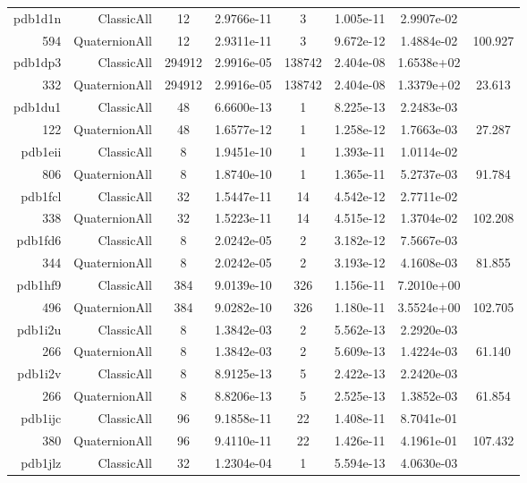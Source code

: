 \begin{xltabular}{\textwidth}{r|rcS[table-format=1.4e+2]cS[table-format=1.3e+2]S[table-format=1.4e+2]S[table-format=-1.3]}
pdb1d1n & ClassicAll & 12 & 2.9766e-11 & 3 & 1.005e-11 & 2.9907e-02 & \\
594 & QuaternionAll & 12 & 2.9311e-11 & 3 & 9.672e-12 & 1.4884e-02 & 100.927\\  \addlinespace
pdb1dp3 & ClassicAll & 294912 & 2.9916e-05 & 138742 & 2.404e-08 & 1.6538e+02 & \\
332 & QuaternionAll & 294912 & 2.9916e-05 & 138742 & 2.404e-08 & 1.3379e+02 & 23.613\\  \addlinespace
pdb1du1 & ClassicAll & 48 & 6.6600e-13 & 1 & 8.225e-13 & 2.2483e-03 & \\
122 & QuaternionAll & 48 & 1.6577e-12 & 1 & 1.258e-12 & 1.7663e-03 & 27.287\\  \addlinespace
pdb1eii & ClassicAll & 8 & 1.9451e-10 & 1 & 1.393e-11 & 1.0114e-02 & \\
806 & QuaternionAll & 8 & 1.8740e-10 & 1 & 1.365e-11 & 5.2737e-03 & 91.784\\  \addlinespace
pdb1fcl & ClassicAll & 32 & 1.5447e-11 & 14 & 4.542e-12 & 2.7711e-02 & \\
338 & QuaternionAll & 32 & 1.5223e-11 & 14 & 4.515e-12 & 1.3704e-02 & 102.208\\  \addlinespace
pdb1fd6 & ClassicAll & 8 & 2.0242e-05 & 2 & 3.182e-12 & 7.5667e-03 & \\
344 & QuaternionAll & 8 & 2.0242e-05 & 2 & 3.193e-12 & 4.1608e-03 & 81.855\\  \addlinespace
pdb1hf9 & ClassicAll & 384 & 9.0139e-10 & 326 & 1.156e-11 & 7.2010e+00 & \\
496 & QuaternionAll & 384 & 9.0282e-10 & 326 & 1.180e-11 & 3.5524e+00 & 102.705\\  \addlinespace
pdb1i2u & ClassicAll & 8 & 1.3842e-03 & 2 & 5.562e-13 & 2.2920e-03 & \\
266 & QuaternionAll & 8 & 1.3842e-03 & 2 & 5.609e-13 & 1.4224e-03 & 61.140\\  \addlinespace
pdb1i2v & ClassicAll & 8 & 8.9125e-13 & 5 & 2.422e-13 & 2.2420e-03 & \\
266 & QuaternionAll & 8 & 8.8206e-13 & 5 & 2.525e-13 & 1.3852e-03 & 61.854\\  \addlinespace
pdb1ijc & ClassicAll & 96 & 9.1858e-11 & 22 & 1.408e-11 & 8.7041e-01 & \\
380 & QuaternionAll & 96 & 9.4110e-11 & 22 & 1.426e-11 & 4.1961e-01 & 107.432\\  \addlinespace
pdb1jlz & ClassicAll & 32 & 1.2304e-04 & 1 & 5.594e-13 & 4.0630e-03 & \\

\end{xltabular}
